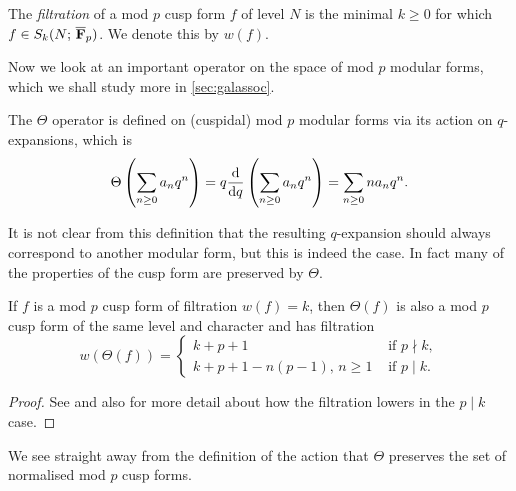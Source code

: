 \documentclass[a4paper,12pt]{article}
\begin{document}
\begin{defn}\label{def:filtration}
The \emph{filtration} of a mod $p$ cusp form $f$ of level $N$ is the minimal $k\ge 0$ for which $f\in S_k(N;\,\overline{\mathbf{F}}_p)$.
We denote this by $w(f)$.
\end{defn}

Now we look at an important operator on the space of mod $p$ modular forms, which we shall study more in \cref{sec:galassoc}.

\begin{defn}\label{def:theta}
The $\Theta$ operator is defined on (cuspidal) mod $p$ modular forms via its action on $q$-expansions, which is
\[
\Theta\left(\sum_{n\ge 0} a_nq^n\right) = q\frac{\mathrm{d}}{\mathrm{d}q} \left(\sum_{n\ge 0} a_nq^n\right) = \sum_{n\ge 0} na_nq^n.
\]
\end{defn}

It is not clear from this definition that the resulting $q$-expansion should  always correspond to another modular form, but this is indeed the case.
In fact many of the properties of the cusp form are preserved by $\Theta$.

\begin{prop}\label{prop:thetafilt}
If $f$ is a mod $p$ cusp form of filtration $w(f) = k$, then $\Theta(f)$ is also a mod $p$ cusp form of the same level and character and has filtration
\[
w(\Theta(f)) = \begin{cases}
k + p + 1 &\text{ if } p\nmid k,\\
k + p + 1 - n(p-1),\, n\ge 1&\text{ if } p\mid k.
\end{cases}
\]
\end{prop}
\begin{proof}
See \cite{Serre73} and also \cite{Jochnowitz} for more detail about how the filtration lowers in the $p\mid k$ case.
\end{proof}

We see straight away from the definition of the action that $\Theta$ preserves the set of normalised mod $p$ cusp forms.
\end{document}
